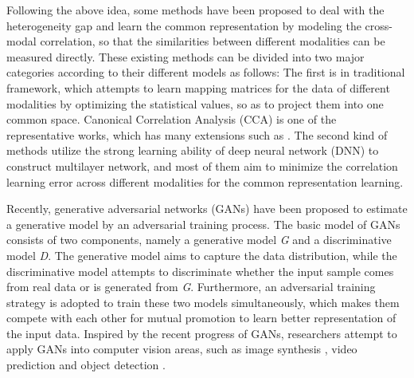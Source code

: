 \documentclass[journal]{IEEEtran}
\begin{document}
Following the above idea, some methods \cite{yang2008harmonizing,DBLP:journals/tmm/ZhuangYW08,zhang2016cross} have been proposed to deal with the heterogeneity gap and learn the common representation by modeling the cross-modal correlation, so that the similarities between different modalities can be measured directly. 
These existing methods can be divided into two major categories according to their different models as follows: 
The first is in traditional framework, which attempts to learn mapping matrices for the data of different modalities by optimizing the statistical values, so as to project them into one common space. Canonical Correlation Analysis (CCA) \cite{RasiwasiaMM10SemanticCCA} is one of the representative works, which has many extensions such as \cite{DBLP:journals/ijcv/GongKIL14,DBLP:journals/neco/HardoonSS04}. The second kind of methods \cite{DBLP:conf/ijcai/PengHQ16,feng12014cross,DBLP:journals/tmm/PangZN15} utilize the strong learning ability of deep neural network (DNN) to construct multilayer network, and most of them aim to minimize the correlation learning error across different modalities for the common representation learning.

Recently, generative adversarial networks (GANs) \cite{goodfellow2014generative} have been proposed to estimate a generative model by an adversarial training process. The basic model of GANs consists of two components, namely a generative model \textit{G} and a discriminative model \textit{D}. The generative model aims to capture the data distribution, while the discriminative model attempts to discriminate whether the input sample comes from real data or is generated from \textit{G}. Furthermore, an adversarial training strategy is adopted to train these two models simultaneously, which makes them compete with each other for mutual promotion to learn better representation of the input data. Inspired by the recent progress of GANs, researchers attempt to apply GANs into computer vision areas, such as image synthesis \cite{radford2015unsupervised}, video prediction \cite{finn2016unsupervised} and object detection \cite{li2017perceptual}. 
\end{document}
